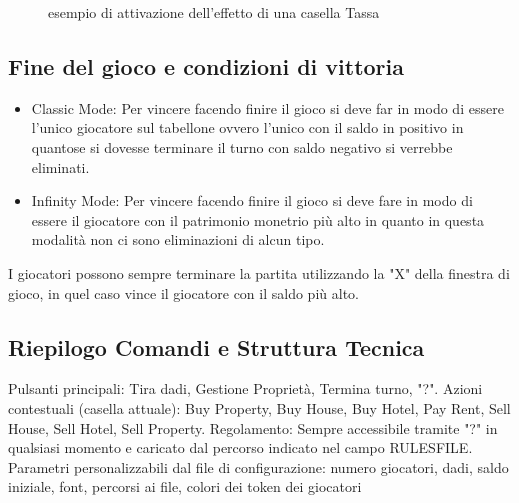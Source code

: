 \begin{figure}[H]
    \centering
    \caption{esempio di attivazione dell'effetto di una casella Tassa}
	\label{img:gamescreen14}
\end{figure}
\subsection{Fine del gioco e condizioni di vittoria}
\begin{itemize}
    \item Classic Mode: Per vincere facendo finire il gioco si deve far in modo di essere l'unico giocatore sul tabellone ovvero l'unico con il saldo in positivo in quanto\newline se si dovesse terminare il turno con saldo negativo si verrebbe eliminati.
    \item Infinity Mode: Per vincere facendo finire il gioco si deve fare in modo di essere il giocatore con il patrimonio monetrio più alto in quanto in questa modalità non ci sono eliminazioni di alcun tipo.
\end{itemize}
I giocatori possono sempre terminare la partita utilizzando la "X" della finestra di gioco, in quel caso vince il giocatore con il saldo più alto.
\subsection{Riepilogo Comandi e Struttura Tecnica}
Pulsanti principali: Tira dadi, Gestione Proprietà, Termina turno, "?".
Azioni contestuali (casella attuale): Buy Property, Buy House, Buy Hotel, Pay Rent, Sell House, Sell Hotel, Sell Property.\newline 
Regolamento: Sempre accessibile tramite "?" in qualsiasi momento e caricato dal percorso indicato nel campo RULESFILE.\newline 
Parametri personalizzabili dal file di configurazione: numero giocatori, dadi, saldo iniziale, font, percorsi ai file, colori dei token dei giocatori
